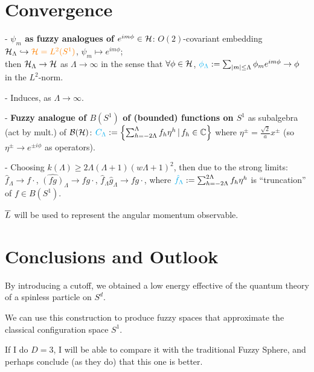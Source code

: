 \section{Convergence}

{
    \color{gray}
    
    - \textbf{$\psi_m$ as fuzzy analogues of $e^{i m \phi} \in \hcal$}: $O(2)$-covariant embedding $\mathcal H_\Lambda \hookrightarrow \textcolor{orange}{\mathcal H = L^2(S^1)}$, $\psi_m \mapsto e^{im\phi}$; \hfill \\then $\mathcal H_\Lambda \to \mathcal H$ as $\Lambda \to \infty$ in the sense that $\forall \phi \in \hcal$, $\lbtext{\phi_\Lambda} := \sum_{|m| \leq \Lambda} \phi_m e^{im\phi} \to \phi$ in the $L^2$-norm.
    
    - Induces,  as $\Lambda \to \infty$.
    
    - \textbf{Fuzzy analogue of $B(S^1)$ of (bounded) functions on $S^1$} as subalgebra (act by mult.) of $\mathcal B(\mathcal H)$: $\textcolor{cyan}{C_\Lambda} := \left\{ \sum_{h = -2\Lambda}^\Lambda f_h \eta^h \,|\, f_h \in \mathbb{C}\right\}$ where $\eta^\pm  = \frac{\sqrt{2}}{a}x^\pm$ (so $\eta^\pm \to e^{\pm i \phi}$ as operators).
    
    - Choosing $k(\Lambda) \geq 2 \Lambda(\Lambda + 1)(w\Lambda+1)^2$, then  due to the strong limits: $\hat f_\Lambda \to f\cdot$, $\hat{(fg)}_\Lambda \to fg\cdot $, $\hat f_\Lambda \hat g_\Lambda \to fg\cdot$, where $\textcolor{cyan}{\hat f_\Lambda} := \sum_{h = -2\Lambda}^{2\Lambda} f_h \eta^h$ is ``truncation'' of $f \in B(S^1)$.
    
}

\linea

$\overline{L}$ will be used to represent the angular momentum observable.

\section{Conclusions and Outlook}

{\color{gray}

    By introducing a cutoff, we obtained a low energy effective of the quantum theory of a spinless particle on $S^d$.
    
    We can use this construction to produce fuzzy spaces that approximate the classical configuration space $S^1$.
    
    If I do $D = 3$, I will be able to compare it with the traditional Fuzzy Sphere, and perhaps conclude (as they do) that this one is better.
}